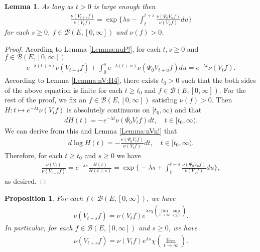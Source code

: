 \documentclass[12pt,a4paper]{amsart}
\numberwithin{equation}{section}
\theoremstyle{plain}
\newtheorem{lem}[thm]{Lemma}
\newtheorem{prop}[thm]{Proposition}
\theoremstyle{definition}
\theoremstyle{remark}
\begin{document}
\begin{lem} \label{Lemma:nVI:H4} 
As long as $t> 0$ is large enough then
\begin{align}
  \frac{\nu(V_{t+s} f)} {\nu(V_t f)} 
  = \exp\Big\{ \lambda s - \int_t^{t+s} \frac{\nu(\Psi_0 V_u f) }{\nu(V_u f)} du\Big\}
  \end{align}
for each $s\geq 0$, $f \in \mathcal B(E,[0,\infty])$ and $\nu(f)>0$.
\end{lem} 
\begin{proof}
Acording to Lemma \ref{Lemma:nuP!}, for each $t, s\geq 0$ and $f\in \mathcal B(E,[0,\infty])$
\begin{align}
  e^{- \lambda (t+s)}\nu(V_{t+s}f) + \int_0^s e^{- \lambda (t+u)} \nu(\Psi_0 V_{t+u}f)du 
  = e^{- \lambda t} \nu(V_tf).
  \end{align}
According to Lemma \ref{Lemma:nV:H4}, there exists $t_0> 0$ such that the both sides of the above equation is finite for each $t\geq t_0$ and $f\in \mathcal B(E,[0,\infty])$. 
For the rest of the proof, we fix an $f \in \mathcal B(E,[0,\infty])$ satisfing $\nu(f)>0$. 
Then $H: t\mapsto e^{-\lambda t}\nu(V_tf)$ is absolutely continuous on $[t_0,\infty)$ and that
\begin{align}
  d H(t) 
  = - e^{- \lambda t} \nu(\Psi_0 V_t f) dt,
  \quad t\in [t_0,\infty).
  \end{align}
We can derive from this and Lemma \ref{Lemma:nVn!} that 
\begin{align}
  d \log H(t) 
  = - \frac{\nu(\Psi_0 V_tf )}{ \nu(V_tf)} dt,
  \quad t \in [t_0,\infty).
  \end{align}
Therefore, for each $t\geq t_0$ and $s\geq 0$ we have
\begin{align}
  \frac{\nu(V_t)}{ \nu(V_{t+s}f)}
  = e^{- \lambda s} \frac{H(t)}{H(t+s)} 
  = \exp\Big\{-\lambda s + \int_t^{t+s} \frac{\nu(\Psi_0 V_u f)}{ \nu(V_u f)} du\Big\},
  \end{align}
as desired.
\end{proof}
\begin{prop} \label{Proposition:nVR:H1:H2:H3:H4} 
For each $f\in \mathcal B(E,[0,\infty])$, we have
\begin{align}
\nu(V_{t+s}f) = \nu(V_tf) e^{\lambda s \chi(\lim_{t\to \infty} \sup_{s\geq 0})}.
\end{align}
In particular, for each $f\in \mathcal B(E,[0,\infty])$ and $s\geq 0$, we have
\begin{align}
\nu(V_{t+s}f) 
= \nu(V_t f) e^{\lambda s} \chi(\lim_{t\to \infty}).
\end{align}
\end{prop}
\end{document}
